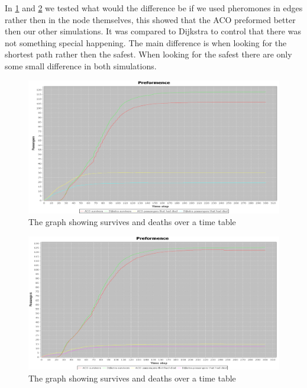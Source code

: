 In \ref{fig:celebShortPherInEdges} and \ref{fig:celebSafePherInEdges} we tested what would the difference be if we used pheromones in edges rather then in the node themselves, this showed that the ACO preformed better then our other simulations. It was compared to Dijkstra to control that there was not something special happening. The main difference is when looking for the shortest path rather then the safest. When looking for the safest there are only some small difference in both simulations.

\begin{figure} [h]
\centering
\hspace*{-1.0in}
\includegraphics[scale=0.35]{images/Graph-using-200-rounds-140-passangers-and-shortest-first-one-hazzard-and-ACO-having-pheremons-in-edges.png}
\caption{The graph showing survives and deaths over a time table}
\label{fig:celebShortPherInEdges}
\end{figure}

\begin{figure} [h]
\centering
\hspace*{-1.0in}
\includegraphics[scale=0.35]{images/Graph-using-200-rounds-140-passangers-and-safest-first-one-hazzard-and-ACO-having-pheremons-in-edges.png}
\caption{The graph showing survives and deaths over a time table}
\label{fig:celebSafePherInEdges}
\end{figure}